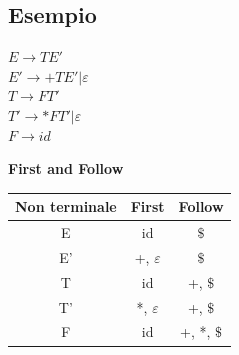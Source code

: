 \subsection{Esempio}
$E \rightarrow TE'$ \\
$E' \rightarrow +TE'|\varepsilon$\\
$T \rightarrow FT'$\\
$T' \rightarrow *FT'|\varepsilon$\\
$F \rightarrow id$\\
\begin{center}

    \textbf{First and Follow}\\
    \begin{tabular}{|c|c|c|}
        \hline
        \textbf{Non terminale} & \textbf{First} & \textbf{Follow} \\
        \hline
        E   &   id                  &   $\$$    \\
        \hline
        E'  &   +, $\varepsilon$    &   $\$$    \\
        \hline
        T   &   id                  &   +, $\$$    \\
        \hline
        T'  &   *, $\varepsilon$    &   +, $\$$    \\
        \hline
        F   &   id                  &   +, *, $\$$    \\
        \hline
    \end{tabular}\\[5pt]


\end{center}
